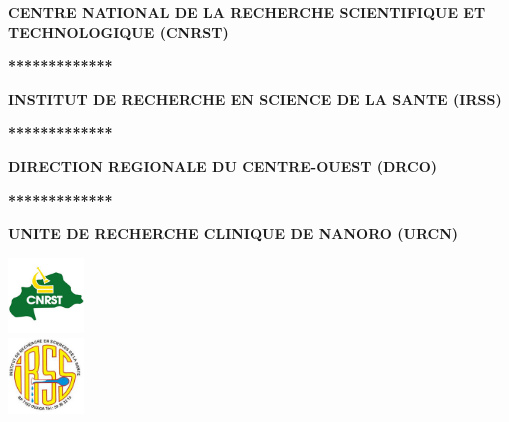 \documentclass[12pt]{article}
\begin{document}
\begin{titlepage}
\begin{minipage}{0.45\textwidth}
\begin{flushleft}
				\end{flushleft}
			\end{minipage}
			\hfill
			\begin{minipage}{0.45\textwidth}
				\begin{flushright} %
					
					\begin{center}
						\textbf{\small CENTRE NATIONAL DE LA RECHERCHE SCIENTIFIQUE ET TECHNOLOGIQUE (CNRST)}
					\end{center}
					
					\begin{center}
						\textbf{\small **************}
					\end{center}
					
					\begin{center}
						\textbf{\small INSTITUT DE RECHERCHE EN SCIENCE DE LA SANTE (IRSS)}
					\end{center}
					
					\begin{center}
						\textbf{\small **************}
					\end{center}
					
					\begin{center}
						\textbf{\small DIRECTION REGIONALE DU CENTRE-OUEST (DRCO)}
					\end{center}
					
					\begin{center}
						\textbf{\small **************}
					\end{center}
					
					\begin{center}
						\textbf{\small UNITE DE RECHERCHE CLINIQUE DE NANORO (URCN)}
					\end{center}
					
					\begin{center}
						\includegraphics[width=2cm]{logo-CNRST2.png} \\
						\includegraphics[width=2cm]{irss.png} %
					\end{center}
				\end{flushright}
			\end{minipage}
			

\end{titlepage}
\end{document}
